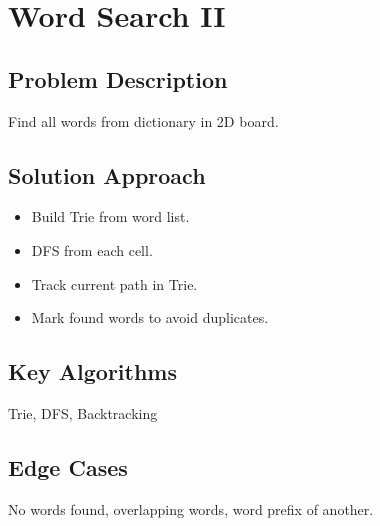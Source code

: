\documentclass[10pt, a4paper]{article}
\begin{document}
\section{Word Search II}
\subsection*{Problem Description}
Find all words from dictionary in 2D board.

\subsection*{Solution Approach}
\begin{itemize}
    \item Build Trie from word list.
    \item DFS from each cell.
    \item Track current path in Trie.
    \item Mark found words to avoid duplicates.
\end{itemize}

\subsection*{Key Algorithms}
Trie, DFS, Backtracking

\subsection*{Edge Cases}
No words found, overlapping words, word prefix of another.
\end{document}
